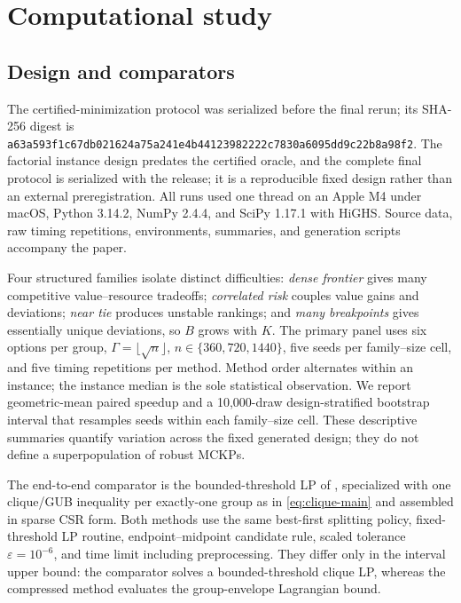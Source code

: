 \documentclass[11pt]{article}
\theoremstyle{plain}
\theoremstyle{definition}
\theoremstyle{remark}
\begin{document}
\section{Computational study}\label{sec:computations}

\subsection{Design and comparators}

The certified-minimization protocol was serialized before the final rerun; its SHA-256 digest is
\nolinkurl{a63a593f1c67db021624a75a241e4b44123982222c7830a6095dd9c22b8a98f2}.
The factorial instance design predates the certified oracle, and the complete final protocol is serialized with the release; it is a reproducible fixed design rather than an external preregistration.  All runs used one thread on an Apple M4 under macOS, Python 3.14.2, NumPy 2.4.4, and SciPy 1.17.1 with HiGHS.  Source data, raw timing repetitions, environments, summaries, and generation scripts accompany the paper.

Four structured families isolate distinct difficulties: \emph{dense frontier} gives many competitive value--resource tradeoffs; \emph{correlated risk} couples value gains and deviations; \emph{near tie} produces unstable rankings; and \emph{many breakpoints} gives essentially unique deviations, so $B$ grows with $K$.  The primary panel uses six options per group, $\Gamma=\lfloor\sqrt n\rfloor$, $n\in\{360,720,1440\}$, five seeds per family--size cell, and five timing repetitions per method.  Method order alternates within an instance; the instance median is the sole statistical observation.  We report geometric-mean paired speedup and a 10,000-draw design-stratified bootstrap interval that resamples seeds within each family--size cell.  These descriptive summaries quantify variation across the fixed generated design; they do not define a superpopulation of robust MCKPs.

The end-to-end comparator is the bounded-threshold LP of \citet{BusingGersingKoster2023}, specialized with one clique/GUB inequality per exactly-one group as in \eqref{eq:clique-main} and assembled in sparse CSR form.  Both methods use the same best-first splitting policy, fixed-threshold LP routine, endpoint--midpoint candidate rule, scaled tolerance $\varepsilon=10^{-6}$, and time limit including preprocessing.  They differ only in the interval upper bound: the comparator solves a bounded-threshold clique LP, whereas the compressed method evaluates the group-envelope Lagrangian bound.
\end{document}
